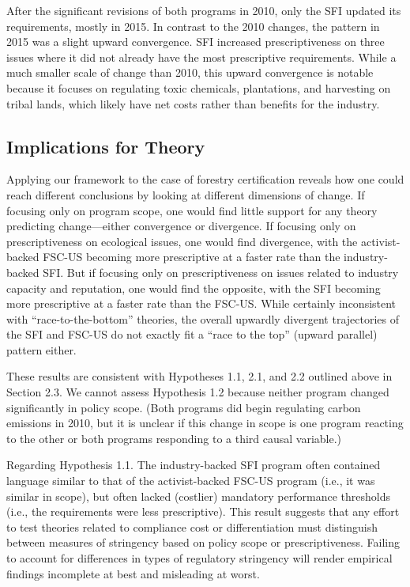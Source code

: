 \documentclass[
      12pt,
            Review ]{article}
\begin{document}
After the significant revisions of both programs in 2010, only the SFI updated its requirements, mostly in 2015. In contrast to the 2010 changes, the pattern in 2015 was a slight upward convergence. SFI increased prescriptiveness on three issues where it did not already have the most prescriptive requirements. While a much smaller scale of change than 2010, this upward convergence is notable because it focuses on regulating toxic chemicals, plantations, and harvesting on tribal lands, which likely have net costs rather than benefits for the industry.

\hypertarget{implications-for-theory}{%
\subsection{Implications for Theory}\label{implications-for-theory}}

Applying our framework to the case of forestry certification reveals how one could reach different conclusions by looking at different dimensions of change. If focusing only on program scope, one would find little support for any theory predicting change---either convergence or divergence. If focusing only on prescriptiveness on ecological issues, one would find divergence, with the activist-backed FSC-US becoming more prescriptive at a faster rate than the industry-backed SFI. But if focusing only on prescriptiveness on issues related to industry capacity and reputation, one would find the opposite, with the SFI becoming more prescriptive at a faster rate than the FSC-US. While certainly inconsistent with ``race-to-the-bottom'' theories, the overall upwardly divergent trajectories of the SFI and FSC-US do not exactly fit a ``race to the top'' (upward parallel) pattern either.

These results are consistent with Hypotheses 1.1, 2.1, and 2.2 outlined above in Section 2.3. We cannot assess Hypothesis 1.2 because neither program changed significantly in policy scope. (Both programs did begin regulating carbon emissions in 2010, but it is unclear if this change in scope is one program reacting to the other or both programs responding to a third causal variable.)

Regarding Hypothesis 1.1. The industry-backed SFI program often contained language similar to that of the activist-backed FSC-US program (i.e., it was similar in scope), but often lacked (costlier) mandatory performance thresholds (i.e., the requirements were less prescriptive). This result suggests that any effort to test theories related to compliance cost or differentiation must distinguish between measures of stringency based on policy scope or prescriptiveness. Failing to account for differences in types of regulatory stringency will render empirical findings incomplete at best and misleading at worst.
\end{document}
